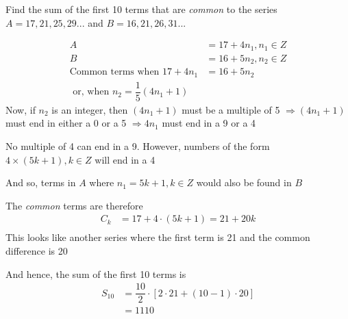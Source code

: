 

\question[4] Find the sum of the first 10 terms that are \textit{common} to the series 
$A = 17,21,25,29 ...$ and $B = 16,21,26,31 ...$


\ifprintanswers
\fi 

\begin{solution}[\halfpage]
  \begin{align}
  	A &= 17 + 4n_1, n_1 \in Z\\
  	B &= 16 + 5n_2, n_2 \in Z \\
  	\text{Common terms when } 17+4n_1 &= 16+5n_2 \\ 
  	\text{ or, when } n_2 = \dfrac{1}{5}(4n_1 + 1)
  \end{align}
  Now, if $n_2$ is an integer, then $(4n_1+1)$ must be a multiple of 5 $\Rightarrow (4n_1+1)$
  must end in either a 0 or a 5 $\Rightarrow 4n_1$ must end in a 9 or a 4
  
  No multiple of 4 can end in a 9. However, numbers of the form $4\times (5k+1), k \in Z$
  will end in a 4
  
  And so, terms in $A$ where $n_1 = 5k+1, k \in Z$ would also be found in $B$
  
  The \textit{common} terms are therefore
  \begin{align}
  	C_k &= 17 + 4\cdot(5k + 1) = 21 + 20k \\
  \end{align}
  This looks like another series where the first term is 21 and the common difference is 20
  
  And hence, the sum of the first 10 terms is
  \begin{align}
  	S_{10} &= \dfrac{10}{2}\cdot\left[ 2\cdot 21 + (10-1)\cdot 20 \right] \\
  	       &= 1110
  \end{align}
\end{solution} 
